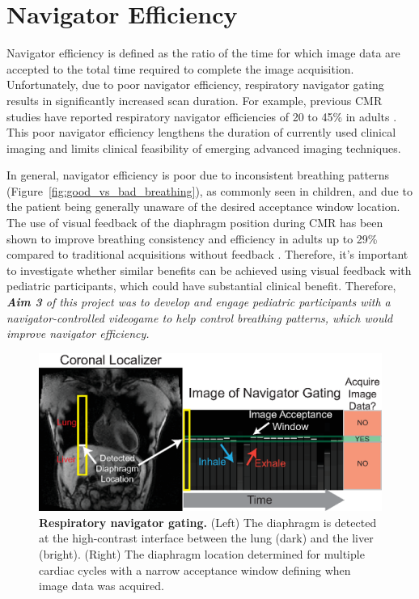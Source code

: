 \section{Navigator Efficiency}
	Navigator efficiency is defined as the ratio of the time for which image data are accepted to the total time required to complete the image acquisition. Unfortunately, due to poor navigator efficiency, respiratory navigator gating results in significantly increased scan duration. For example, previous CMR studies have reported respiratory navigator efficiencies of 20 to 45\% in adults \cite{Abd-Elmoniem2011,Feuerlein2009,Jhooti2011,Wang1996}. This poor navigator efficiency lengthens the duration of currently used clinical imaging and limits clinical feasibility of emerging advanced imaging techniques.
	
	In general, navigator efficiency is poor due to inconsistent breathing patterns \cite{Liu1993,Wang1995a,Taylor1997a} (Figure~\ref{fig:good_vs_bad_breathing}), as commonly seen in children, and due to the patient being generally unaware of the desired acceptance window location. The use of visual feedback of the diaphragm position during CMR has been shown to improve breathing consistency and efficiency in adults up to 29\% compared to traditional acquisitions without feedback \cite{Feuerlein2009,Jhooti2011}. Therefore, it's important to investigate whether similar benefits can be achieved using visual feedback with pediatric participants, which could have substantial clinical benefit. Therefore, \textit{\textbf{Aim 3} of this project was to develop and engage pediatric participants with a navigator-controlled videogame to help control breathing patterns, which would improve navigator efficiency.}
	
	\begin{figure}
		\centering
		\includegraphics{figures/intro/navigator_gating_explanation}
		\caption[Respiratory navigator gating]{\textbf{Respiratory navigator gating.} (Left) The diaphragm is detected at the high-contrast interface between the lung (dark) and the liver (bright). (Right) The diaphragm location determined for multiple cardiac cycles with a narrow acceptance window	defining when image data was acquired.}
		\label{fig:navigator_gating_explanation}
	\end{figure}

